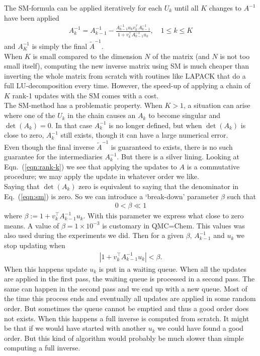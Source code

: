 \documentclass[11pt]{article}
\numberwithin{figure}{section}
\numberwithin{table}{section}
\begin{document}
			The SM-formula can be applied iteratively for each $U_k$ until all $K$ changes to $A^{-1}$ have been applied
			\begin{align}\label{eqn:sm}
				A^{-1}_k = A^{-1}_{k-1} - \frac{A^{-1}_{k-1}u_kv_k^\top A^{-1}_{k-1}}{1+v_k^\top A^{-1}_{k-1}u_k}, \quad 1 \leq k \leq K   
			\end{align}
			and $A_K^{-1}$ is simply the final $\widetilde{A}^{-1}$.\\
			
			When $K$ is small compared to the dimension $N$ of the matrix (and $N$ is not too small itself), computing the new inverse matrix using SM is much cheaper than inverting the whole matrix from scratch with routines like LAPACK that do a full LU-decomposition every time. However, the speed-up of applying a chain of $K$ rank-1 updates with the SM comes with a cost.\\
			
			The SM-method has a problematic property. When $K>1$, a situation can arise where one of the $U_k$ in the chain causes an $A_k$ to become singular and $\det\left(A_k\right)=0$. In that case $A^{-1}_{k}$ is no longer defined, but when $\det\left(A_k\right)$ is close to zero, $A^{-1}_{k}$ still exists, though it can have a large numerical error.\\
			
			Even though the final inverse $\widetilde{A}^{-1}$ is guaranteed to exists, there is no such guarantee for the intermediaries $A_k^{-1}$. But there is a silver lining. Looking at Eqn.~(\ref{eqn:rank-k}) we see that applying the updates to $A$ is a commutative procedure; we may apply the update in whatever order we like.\\
			
			Saying that $\det\left(A_k\right)$ zero is equivalent to saying that the denominator in Eq.~(\ref{eqn:sm}) is zero. So we can introduce a `break-down' parameter $\beta$ such that
			\begin{align}\label{eqn:break-down-parameter}
				0 < \beta \ll 1
			\end{align}
			where $\beta := 1+v_k^\top A^{-1}_{k-1}u_k$. With this parameter we express what close to zero means. A value of $\beta = 1\times 10^{-3}$ is customary in QMC=Chem. This values was also used during the experiments we did.  Then for a given $\beta$, $A^{-1}_{k-1}$ and $u_k$ we stop updating when
			\begin{align}\label{eqn:break-down-condition}
				\left|1+v_k^\top A^{-1}_{k-1}u_k\right| < \beta.
			\end{align}
			When this happens update $u_k$ is put in a waiting queue. When all the updates are applied in the first pass, the waiting queue is processed in a second pass. The same can happen in the second pass and we end up with a new queue. Most of the time this process ends and eventually all updates are applied in some random order. But sometimes the queue cannot be emptied and thus a good order does not exists. When this happens a full inverse is computed from scratch. It might be that if we would have started with another $u_k$ we could have found a good order. But this kind of algorithm would probably be much slower than simple computing a full inverse.\\
			
\end{document}
